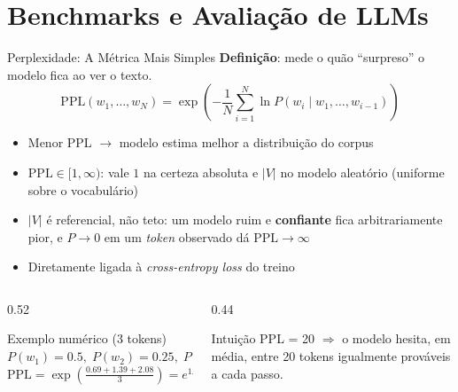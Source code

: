 \documentclass[aspectratio=169, xcolor=dvipsnames]{beamer}
\begin{document}
  \section{Benchmarks e Avaliação de LLMs}

  \begin{frame}{Perplexidade: A Métrica Mais Simples}
    \textbf{Definição}: mede o quão ``surpreso'' o modelo fica ao ver o texto.
    \[
      \mathrm{PPL}(w_1,\ldots,w_N)
        = \exp\!\left(-\frac{1}{N}\sum_{i=1}^{N}\ln P(w_i \mid w_1,\ldots,w_{i-1})\right)
    \]
    \begin{itemize}\small
      \item Menor PPL $\to$ modelo estima melhor a distribuição do corpus
      \item $\mathrm{PPL} \in [1, \infty)$: vale $1$ na certeza absoluta e $|V|$ no modelo aleatório (uniforme sobre o vocabulário)
      \item $|V|$ é referencial, não teto: um modelo ruim e \textbf{confiante} fica arbitrariamente pior, e $P \to 0$ em um \textit{token} observado dá $\mathrm{PPL} \to \infty$
      \item Diretamente ligada à \textit{cross-entropy loss} do treino
    \end{itemize}
    \begin{columns}[T]
      \begin{column}{0.52\textwidth}
        \begin{exampleblock}{Exemplo numérico (3 tokens)}
          $P(w_1){=}0.5,\; P(w_2){=}0.25,\; P(w_3){=}0.125$\\[2pt]
          $\mathrm{PPL} = \exp\!\left(\tfrac{0.69 + 1.39 + 2.08}{3}\right) = e^{1.39} = \textbf{4.0}$
        \end{exampleblock}
      \end{column}
      \begin{column}{0.44\textwidth}
        \begin{exampleblock}{Intuição}
          PPL = 20 $\Rightarrow$ o modelo hesita, em média, entre 20 tokens igualmente prováveis a cada passo.
        \end{exampleblock}
      \end{column}
    \end{columns}
  \end{frame}
\end{document}
